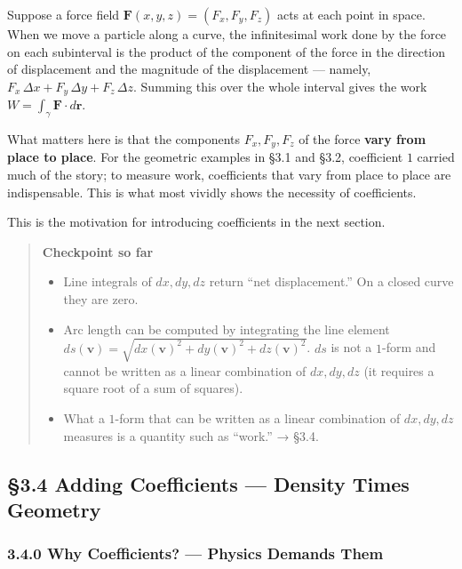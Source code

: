 \documentclass[a4paper,12pt,openany]{book}
\begin{document}
Suppose a force field \(\mathbf{F}(x,y,z) = (F_x, F_y, F_z)\) acts at
each point in space. When we move a particle along a curve, the
infinitesimal work done by the force on each subinterval is the product
of the component of the force in the direction of displacement and the
magnitude of the displacement — namely,
\(F_x\,\Delta x + F_y\,\Delta y + F_z\,\Delta z\). Summing this over the
whole interval gives the work
\(W = \int_\gamma \mathbf{F}\cdot d\mathbf{r}\).

What matters here is that the components \(F_x, F_y, F_z\) of the force
\textbf{vary from place to place}. For the geometric examples in §3.1
and §3.2, coefficient \(1\) carried much of the story; to measure work,
coefficients that vary from place to place are indispensable. This is
what most vividly shows the necessity of coefficients.

This is the motivation for introducing coefficients in the next section.

\begin{quote}
\textbf{Checkpoint so far}

\begin{itemize}
\item
  Line integrals of \(dx, dy, dz\) return ``net displacement.'' On a
  closed curve they are zero.
\item
  Arc length can be computed by integrating the line element
  \(ds(\mathbf{v}) = \sqrt{dx(\mathbf{v})^2 + dy(\mathbf{v})^2 + dz(\mathbf{v})^2}\).
  \(ds\) is not a \(1\)-form and cannot be written as a linear
  combination of \(dx, dy, dz\) (it requires a square root of a sum of
  squares).
\item
  What a \(1\)-form that can be written as a linear combination of
  \(dx, dy, dz\) measures is a quantity such as ``work.'' → §3.4.
\end{itemize}
\end{quote}

\par\vspace{0.35em}\par

\hypertarget{adding-coefficients-density-times-geometry}{%
\subsection{§3.4 Adding Coefficients — Density Times
Geometry}\label{adding-coefficients-density-times-geometry}}

\hypertarget{why-coefficients-physics-demands-them}{%
\subsubsection{3.4.0 Why Coefficients? — Physics Demands
Them}\label{why-coefficients-physics-demands-them}}
\end{document}
